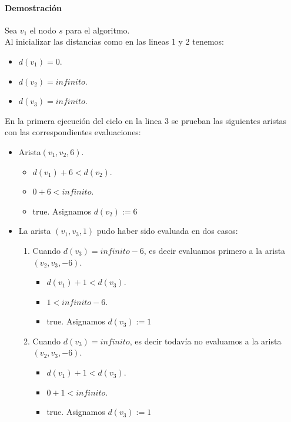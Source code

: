 \documentclass[12pt]{article}
\begin{document}
	\paragraph{Demostración} Sea $v_1$ el nodo $s$ para el algoritmo.\\
	Al inicializar las distancias como en las lineas 1 y 2 tenemos:
	\begin{itemize}
		\item $d(v_1)=0$. 
		\item $d(v_2)=infinito$.
		\item $d(v_3)=infinito$.
	\end{itemize}
	En la primera ejecución del ciclo en la linea 3 se prueban las siguientes aristas con las correspondientes evaluaciones:
	\begin{itemize}
		\item Arista$(v_1, v_2, 6)$.
		\begin{itemize}
				\item $d(v_1) + 6 < d(v_2)$.
				\item $0 + 6 < infinito$.
				\item true. Asignamos $d(v_2) := 6$
			\end{itemize}
	\item La arista $(v_1, v_3, 1)$ pudo haber sido evaluada en dos casos:
	\begin{enumerate}
		\item Cuando $d(v_3)=infinito - 6$, es decir evaluamos primero a la arista $(v_2, v_3, -6)$.
		\begin{itemize}
			\item $d(v_1) + 1 < d(v_3)$.
			\item $1 < infinito-6$.
			\item true. Asignamos $d(v_3) := 1$
		\end{itemize}
		\item Cuando $d(v_3)=infinito$, es decir todavía no evaluamos a la arista $(v_2, v_3, -6)$.
		\begin{itemize}
			\item $d(v_1) + 1 < d(v_3)$.
			\item $0 + 1 < infinito$.
			\item true. Asignamos $d(v_3) := 1$
		\end{itemize}
		

\end{enumerate}
\end{itemize}
\end{document}

